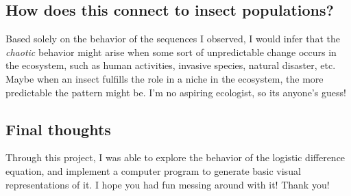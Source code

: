 \documentclass{article}
\begin{document}
\subsection*{How does this connect to insect populations?}
Based solely on the behavior of the sequences I observed, I would infer that the \textit{chaotic} behavior might arise when some sort of unpredictable change occurs in the ecosystem, such as human activities, invasive species, natural disaster, etc. Maybe when an insect fulfills the role in a niche in the ecosystem, the more predictable the pattern might be. I'm no aspiring ecologist, so its anyone's guess!
\subsection*{Final thoughts}
Through this project, I was able to explore the behavior of the logistic difference equation, and implement a computer program to generate basic visual representations of it. I hope you had fun messing around with it! Thank you!
\end{document}
